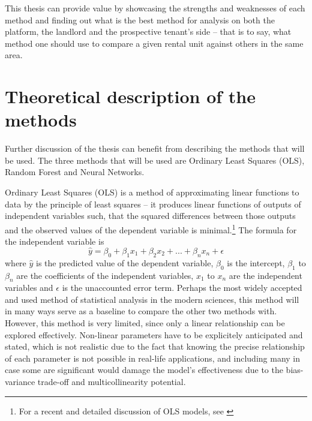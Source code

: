 \documentclass[12pt]{report}
\begin{document}
This thesis can provide value by showcasing the strengths and weaknesses of each method and finding out what is the best method for analysis on both the platform, the landlord and the prospective tenant’s side – that is to say, what method one should use to compare a given rental unit against others in the same area.
\section{Theoretical description of the methods}

Further discussion of the thesis can benefit from describing the methods that will be used. The three methods that will be used are Ordinary Least Squares (OLS), Random Forest and Neural Networks.

Ordinary Least Squares (OLS) is a method of approximating linear functions to data by the principle of least squares – it produces linear functions of outputs of independent variables such, that the squared differences between those outputs and the observed values of the dependent variable is minimal.\footnote{For a recent and detailed discussion of OLS models, see \cite{AstiviaZumbo2019}} The formula for the independent variable is 
\begin{equation}
\hat{y} = \beta_0 + \beta_1x_1 + \beta_2x_2 + ... + \beta_nx_n + \epsilon
\end{equation}
where $\hat{y}$ is the predicted value of the dependent variable, $\beta_0$ is the intercept, $\beta_1$ to $\beta_n$ are the coefficients of the independent variables, $x_1$ to $x_n$ are the independent variables and $\epsilon$ is the unaccounted error term.
Perhaps the most widely accepted and used method of statistical analysis in the modern sciences, this method will in many ways serve as a baseline to compare the other two methods with. However, this method is very limited, since only a linear relationship can be explored effectively. Non-linear parameters have to be explicitely anticipated and stated, which is not realistic due to the fact that knowing the precise relationship of each parameter is not possible in real-life applications, and including many in case some are significant would damage the model's effectiveness due to the bias-variance trade-off and multicollinearity potential.
\end{document}
